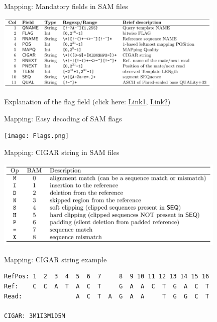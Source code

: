 \documentclass[presentation]{beamer}
\begin{document}
\begin{frame}[label=sec-3-1-9]{Mapping: Mandatory fields in SAM files}
\begin{center}

\includegraphics[width=11cm]{SamFields.png}

\normalsize{}

Explanation of the flag field (click here: \href{https://ppotato.wordpress.com/2010/08/25/samtool-bitwise-flag-paired-reads/}{Link1}, \href{http://broadinstitute.github.io/picard/explain-flags.html}{Link2})

\end{center}
\end{frame}

\begin{frame}[label=sec-3-1-10]{Mapping: Easy decoding of SAM flags}
\begin{center}

\texttt{[image: Flags.png]}


\end{center}
\end{frame}
\begin{frame}[label=sec-3-1-11]{Mapping: CIGAR string in SAM files}
\begin{center}

\includegraphics[width=11cm]{CIGAR.png}


\end{center}
\end{frame}
\begin{frame}[fragile,label=sec-3-1-12]{Mapping: CIGAR string example}
 \begin{verbatim}
RefPos: 1  2  3  4  5  6  7     8  9 10 11 12 13 14 15 16 
Ref:    C  C  A  T  A  C  T     G  A  A  C  T  G  A  C  T
Read:               A  C  T  A  G  A  A     T  G  G  C  T

CIGAR: 3M1I3M1D5M
\end{verbatim}
\end{frame}
\end{document}
